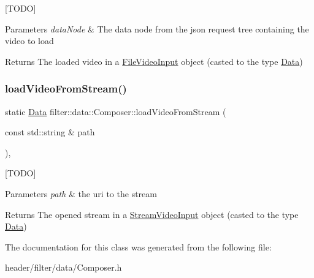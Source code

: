 \mbox{[}T\+O\+DO\mbox{]} 
\begin{DoxyParams}{Parameters}
{\em data\+Node} & The data node from the json request tree containing the video to load \\
\hline
\end{DoxyParams}
\begin{DoxyReturn}{Returns}
The loaded video in a \hyperlink{classfilter_1_1data_1_1_file_video_input}{File\+Video\+Input} object (casted to the type \hyperlink{classfilter_1_1data_1_1_data}{Data}) 
\end{DoxyReturn}
\mbox{\label{classfilter_1_1data_1_1_composer_a6bdfb001ccac438b950edb1b6a14abe3}} 
\subsubsection{\texorpdfstring{load\+Video\+From\+Stream()}{loadVideoFromStream()}}
{\footnotesize\ttfamily static \hyperlink{classfilter_1_1data_1_1_data}{Data} filter\+::data\+::\+Composer\+::load\+Video\+From\+Stream (\begin{DoxyParamCaption}\item[{const std\+::string \&}]{path }\end{DoxyParamCaption})\hspace{0.3cm}{\ttfamily [inline]}, {\ttfamily [static]}}

\mbox{[}T\+O\+DO\mbox{]} 
\begin{DoxyParams}{Parameters}
{\em path} & the uri to the stream \\
\hline
\end{DoxyParams}
\begin{DoxyReturn}{Returns}
The opened stream in a \hyperlink{classfilter_1_1data_1_1_stream_video_input}{Stream\+Video\+Input} object (casted to the type \hyperlink{classfilter_1_1data_1_1_data}{Data}) 
\end{DoxyReturn}


The documentation for this class was generated from the following file\+:\begin{DoxyCompactItemize}
\item 
header/filter/data/Composer.\+h\end{DoxyCompactItemize}
